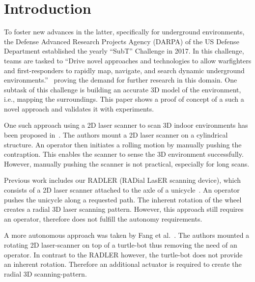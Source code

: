 \section{Introduction}
\label{sec:introduction}

To foster new advances in the latter, specifically for underground environments, the  Defense Advanced Research Projects Agency (DARPA) of the US Defense Department established the yearly ``SubT'' Challenge in 2017.
In this challenge, teams are tasked to ``Drive novel approaches and technologies to allow warfighters and first-responders to rapidly map, navigate, and search dynamic underground environments.''~\cite{allen} proving the demand for further research in this domain.
One subtask of this challenge is building an accurate 3D model of the environment, i.e., mapping the surroundings. 
This paper shows a proof of concept of a such a novel approach and validates it with experiments.

One such approach using a 2D laser scanner to scan 3D indoor environments has been proposed in~\cite{classical_mechanics_scanner}.
The authors mount a 2D laser scanner on a cylindrical structure.
An operator then initiates a rolling motion by manually pushing the contraption.
This enables the scanner to sense the 3D environment successfully.
However, manually pushing the scanner is not practical, especially for long scans.

Previous work includes our RADLER (RADial LasER scanning device), which consists of a 2D laser scanner attached to the axle of a unicycle~\cite{ISER2018}.
An operator pushes the unicycle along a requested path.
The inherent rotation of the wheel creates a radial 3D laser scanning pattern.
However, this approach still requires an operator, therefore does not fulfill the autonomy requirements. 

A more autonomous approach was taken by Fang et al.~\cite{3D_per_2D_based}.
The authors mounted a rotating 2D laser-scanner on top of a turtle-bot thus removing the need of an operator.
In contrast to the RADLER however, the turtle-bot does not provide an inherent rotation.
Therefore an additional actuator is required to create the radial 3D scanning-pattern. 

